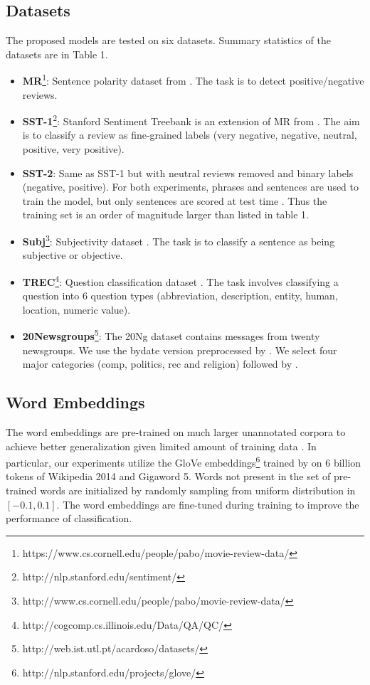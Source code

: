\documentclass[11pt]{article}
\begin{document}
\subsection{Datasets}
The proposed models are tested on six datasets. Summary statistics of the datasets are in Table 1.
\begin{itemize}
\item \textbf{MR}\footnote{https://www.cs.cornell.edu/people/pabo/movie-review-data/}:    Sentence polarity dataset from . The task is to detect positive/negative reviews.

\item \textbf{SST-1}\footnote{http://nlp.stanford.edu/sentiment/}:   Stanford Sentiment Treebank is an extension of MR from . The aim is to classify a review as fine-grained labels (very negative, negative, neutral, positive, very positive).

\item \textbf{SST-2}:    Same as SST-1 but with neutral reviews removed and binary labels (negative, positive). For both experiments, phrases and sentences are used to train the model, but only sentences are scored at test time \cite{socher2013recursive,le2014distributed}. Thus the training set is an order of magnitude larger than listed in table 1.

\item \textbf{Subj}\footnote{http://www.cs.cornell.edu/people/pabo/movie-review-data/}:    Subjectivity dataset \cite{pang2004sentimental}. The task is to classify a sentence as being subjective or objective.

\item \textbf{TREC}\footnote{http://cogcomp.cs.illinois.edu/Data/QA/QC/}:    Question classification dataset \cite{li2002learning}. The task involves classifying a question into 6 question types (abbreviation, description, entity, human, location, numeric value).

\item \textbf{20Newsgroups}\footnote{http://web.ist.utl.pt/acardoso/datasets/}:    The 20Ng dataset contains messages from twenty newsgroups. We use the bydate version preprocessed by . We select four major categories (comp, politics, rec and religion) followed by . 
\end{itemize}



\subsection{Word Embeddings}
The word embeddings are pre-trained on much larger unannotated corpora to achieve better generalization given limited amount of training data \cite{turian2010word}. In particular, our experiments utilize the GloVe embeddings\footnote{http://nlp.stanford.edu/projects/glove/} trained by  on 6 billion tokens of Wikipedia 2014 and Gigaword 5. Words not present in the set of pre-trained words are initialized by randomly sampling from uniform distribution in $[-0.1, 0.1]$. The word embeddings are fine-tuned during training to improve the performance of classification.
\end{document}
